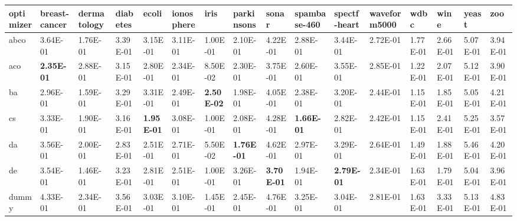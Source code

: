 \begin{table}
    \begin{adjustbox}{width=\linewidth}
        \begin{tabular}{llllllllllllllll}
            \toprule
            optimizer & breast-cancer     & dermatology       & diabetes          & ecoli             & ionosphere        & iris              & parkinsons        & sonar             & spambase-460      & spectf-heart      & waveform5000      & wdbc              & wine              & yeast             & zoo\tabularnewline
            \midrule
            abco      & 3.64E-01          & 1.76E-01          & 3.39E-01          & 3.15E-01          & 3.11E-01          & 1.00E-01          & 2.10E-01          & 4.22E-01          & 2.88E-01          & 3.44E-01          & 2.72E-01          & 1.77E-01          & 2.66E-01          & 5.07E-01          & 3.94E-01\tabularnewline
            aco       & \textbf{2.35E-01} & 2.88E-01          & 3.15E-01          & 2.80E-01          & 2.34E-01          & 8.50E-02          & 2.30E-01          & 3.75E-01          & 2.60E-01          & 3.55E-01          & 2.85E-01          & 1.22E-01          & 2.07E-01          & 5.12E-01          & 3.90E-01\tabularnewline
            ba        & 2.96E-01          & 1.59E-01          & 3.29E-01          & 3.31E-01          & 2.49E-01          & \textbf{2.50E-02} & 1.98E-01          & 4.05E-01          & 2.38E-01          & 3.20E-01          & 2.44E-01          & 1.15E-01          & 1.85E-01          & 5.05E-01          & 4.21E-01\tabularnewline
            cs        & 3.33E-01          & 1.90E-01          & 3.16E-01          & \textbf{1.95E-01} & 3.08E-01          & 1.00E-01          & 2.08E-01          & 4.28E-01          & \textbf{1.66E-01} & 2.82E-01          & 2.42E-01          & 1.15E-01          & 2.41E-01          & 5.25E-01          & 3.57E-01\tabularnewline
            da        & 3.56E-01          & 2.00E-01          & 2.83E-01          & 2.51E-01          & 2.71E-01          & 5.50E-02          & \textbf{1.76E-01} & 4.62E-01          & 2.97E-01          & 3.29E-01          & 2.64E-01          & 1.49E-01          & 1.88E-01          & 5.46E-01          & 4.20E-01\tabularnewline
            de        & 3.54E-01          & 1.46E-01          & 3.23E-01          & 2.81E-01          & 2.51E-01          & 1.00E-01          & 3.26E-01          & \textbf{3.70E-01} & 1.94E-01          & \textbf{2.79E-01} & 2.34E-01          & 1.63E-01          & 1.79E-01          & 5.04E-01          & 3.96E-01\tabularnewline
            dummy     & 4.33E-01          & 2.34E-01          & 3.56E-01          & 3.03E-01          & 3.10E-01          & 1.45E-01          & 2.45E-01          & 4.76E-01          & 3.25E-01          & 3.04E-01          & 2.81E-01          & 1.63E-01          & 3.33E-01          & 5.13E-01          & 4.83E-01\tabularnewline

\end{tabular}
\end{adjustbox}
\end{table}
